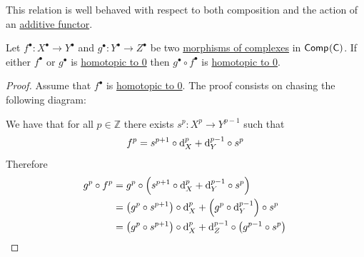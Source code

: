 \documentclass[../../main]{subfiles}
\begin{document}
This relation is well behaved with respect to both composition and the action of an \hyperref[def:additive-functor]{additive functor}.

\begin{lemma}\label{lemma:composition-homotopic-to-zero}
  Let \(f^{\bullet}\colon X^{\bullet} \to Y^{\bullet}\) and \(g^{\bullet}\colon Y^{\bullet} \to Z^{\bullet}\) be two \hyperref[def:complex]{morphisms of complexes} in \(\mathsf{Comp}^{}(\mathsf{C})\).
  If either \(f^{\bullet}\) or \(g^{\bullet}\) is \hyperref[def:homotopy]{homotopic to 0} then \(g^{\bullet} \circ f^{\bullet}\) is \hyperref[def:homotopy]{homotopic to 0}.
\end{lemma}
\begin{proof}
  Assume that \(f^{\bullet}\) is \hyperref[def:homotopy]{homotopic to 0}.
  The proof consists on chasing the following diagram:
  \begin{center}
  \end{center}

  We have that for all \(p \in \mathbb{Z}\) there exists \(s^{p}: X^{p} \to Y^{p-1}\) such that
  \begin{equation*}
    f^{p} = s^{p+1} \circ \mathrm{d}_{X}^{p} + \mathrm{d}_{Y}^{p-1} \circ s^{p}
  \end{equation*}
  Therefore
  \begin{align*}
    g^{p} \circ f^{p} &= g^{p} \circ \left( s^{p+1} \circ \mathrm{d}_{X}^{p} + \mathrm{d}_{Y}^{p-1} \circ s^{p} \right) \\
                  &= \left(g^{p} \circ s^{p+1}\right) \circ \mathrm{d}_{X}^{p} + \left(g^{p} \circ \mathrm{d}_{Y}^{p-1}\right) \circ s^{p} \\
                  &= \left(g^{p} \circ s^{p+1}\right) \circ \mathrm{d}_{X}^{p} + \mathrm{d}_{Z}^{p-1} \circ \left( g^{p-1} \circ s^{p} \right) \qedhere
  \end{align*}
\end{proof}
\end{document}

